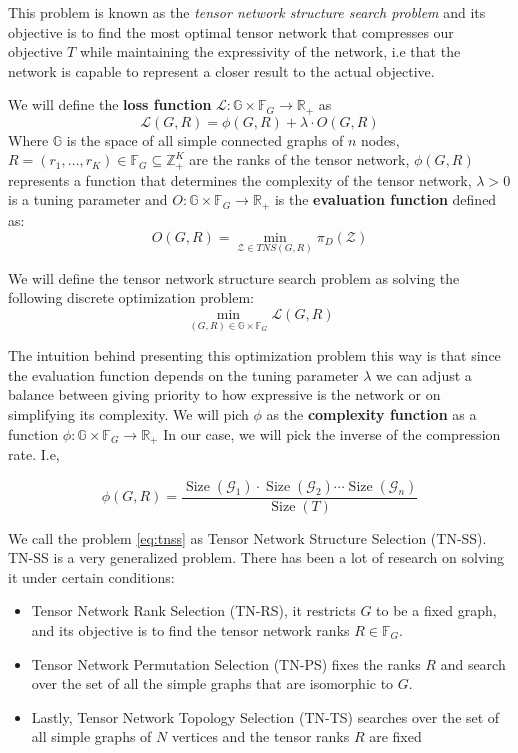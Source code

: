 \documentclass[11pt,a4paper,openright,oneside]{book}
\numberwithin{equation}{section}
\DeclareMathOperator{\size}{Size}
\begin{document}
{This problem is known as the \textit{tensor network structure search problem} and its objective 
is to find the most optimal tensor network that 
compresses our objective $T$ while maintaining the expressivity of the network, i.e that the network
is capable to represent a closer result to the actual objective. 

We will define the \textbf{loss function} $\mathcal{L}: \mathbb{G} \times \mathbb{F}_G \rightarrow \mathbb{R}_+$ as
$$\mathcal{L}(G,R) = \phi(G, R) + \lambda \cdot O(G, R) $$
Where $\mathbb{G}$ is the space of all simple connected graphs of $n$ nodes, ${R = (r_1, \dots, r_K) \in \mathbb{F}_G \subseteq
\mathbb{Z}_+^K}$ are the ranks of the tensor network, $\phi(G, R)$ represents a function that determines the complexity of the
tensor network, $\lambda > 0$ is a tuning parameter and $O: \mathbb{G} \times \mathbb{F}_G \rightarrow \mathbb{R}_+$ is the 
\textbf{evaluation function} defined as:
\begin{equation}
    O(G, R) = \min_{\mathcal{Z} \in TNS(G,R)} \pi_D (\mathcal{Z})
    \label{eq:tnale-min-obj}
\end{equation}

We will define the tensor network structure search problem as solving the following discrete optimization problem:
\begin{equation}
    \min_{(G, R) \in \mathbb{G} \times \mathbb{F}_G} \mathcal{L}(G, R)
\label{eq:tnss}
\end{equation}

The intuition behind presenting this optimization problem this way is that since the evaluation function depends on the tuning parameter $\lambda$
we can adjust a balance between giving priority to how expressive is the network or on 
simplifying its complexity. We will pich $\phi$ as the \textbf{complexity function} as a function $\phi : \mathbb{G} \times \mathbb{F}_G \rightarrow \mathbb{R}_+$
In our case, we will pick the inverse of the compression rate. I.e,

$$\phi(G, R) = \frac{\size(\mathcal{G}_1) \cdot \size(\mathcal{G}_2) \cdots \size(\mathcal{G}_n)}{\size(T)}$$

We call the problem \ref{eq:tnss} as Tensor Network Structure Selection (TN-SS). TN-SS is a very generalized problem.
There has been a lot of research on solving it under certain conditions:
\begin{itemize}
    \item Tensor Network Rank Selection (TN-RS), it restricts $G$ to be a fixed graph, and its objective is to find the
tensor network ranks $R \in \mathbb{F}_G$.
    \item Tensor Network Permutation Selection (TN-PS) fixes the ranks $R$ and search over the set
of all the simple graphs that are isomorphic to $G$.
    \item Lastly, Tensor Network Topology Selection (TN-TS) searches over the set of all simple graphs of $N$ vertices and
        the tensor ranks $R$ are fixed
\end{itemize}

}
\end{document}
